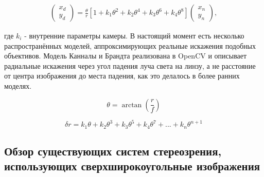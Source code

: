  \begin{equation}	%
	\begin{split}
        \begin{pmatrix}x_d\\y_d\end{pmatrix} = \frac{\theta}{r}\left[ 1 + k_1\theta^2 + k_2\theta^4 + k_3\theta^6 + k_4\theta^8\right]\begin{pmatrix}x_n\\y_n\end{pmatrix},
        \label{eqn:fisheye_distortion}
    \end{split}
\end{equation}

где $k_i$ - внутренние параметры камеры. 
В настоящий момент есть несколько распространённых моделей, аппроксимирующих реальные искажения подобных объективов. Модель Канналы и 
Брандта \cite{opencv_model} реализована в OpenCV и описывает радиальные искажения через угол падения луча света на линзу, а не расстояние  
от центра изображения до места падения, как это делалось в более ранних моделях. 

\begin{equation}	
        \theta = \arctan(\frac{r}{f})
        \label{eqn:kannala_theta}
\end{equation}

\begin{equation}	
    \delta r = k_1\theta + k_2\theta^3 + k_3\theta^5 + k_4\theta^7 + ... + k_n\theta^{n+1}
    \label{eqn:kannala_delta}
\end{equation}

\subsection{Обзор существующих систем стереозрения, использующих сверхширокоугольные изображения}

